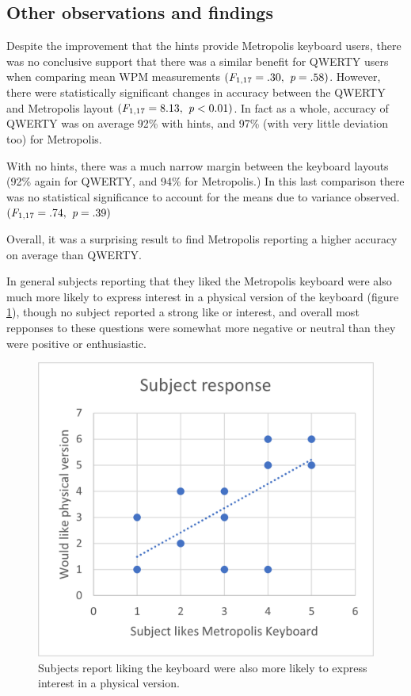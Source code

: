 \documentclass[english]{vgtc}
\begin{document}
\subsection{Other observations and findings}

Despite the improvement that the hints provide Metropolis keyboard users, there was no conclusive support that there was a similar benefit for QWERTY users when comparing mean WPM measurements $(\emph{F}_{1,17} = .30, \emph{ p}=.58)$.  However, there were statistically significant changes in accuracy between the QWERTY and Metropolis layout $(\emph{F}_{1,17} = 8.13, \emph{ p}<0.01)$. In fact as a whole, accuracy of QWERTY was on average 92\% with hints, and 97\% (with very little deviation too) for Metropolis.

With no hints, there was a much narrow margin between the keyboard layouts (92\% again for QWERTY, and 94\% for Metropolis.) In this last comparison there was no statistical significance to account for the means due to variance observed. $(\emph{F}_{1,17} = .74, \emph{ p}=.39)$ 

Overall, it was a surprising result to find Metropolis reporting a higher accuracy on average than QWERTY.

In general subjects reporting that they liked the Metropolis keyboard were also much more likely to express interest in a physical version of the keyboard (figure \ref{fig:interest}), though no subject reported a strong like or interest, and overall
most repponses to these questions were somewhat more negative or neutral than they were positive or enthusiastic.

\begin{figure}
  \centering
  \includegraphics[width=0.95\columnwidth]{subject-response.png}
  \caption{Subjects report liking the keyboard were also more likely to express interest in a physical version.}
  \label{fig:interest}
\end{figure}
\end{document}
